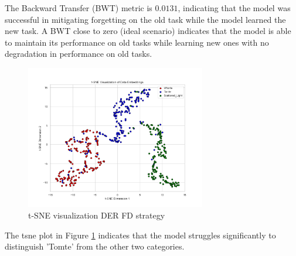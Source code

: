 The Backward Transfer (BWT) metric is $0.0131$, indicating that the model was successful in mitigating forgetting on the old task while the model learned the new task. A BWT close to zero (ideal scenario) indicates that the model is able to maintain its performance on old tasks while learning new ones with no degradation in performance on old tasks.

\begin{figure}[H]
    \centering
    \includegraphics[width=0.7\textwidth]{Grad Assignment/Images/tSNE_FractalDimension_DER_test.png}
    \caption{t-SNE visualization DER FD strategy}
    \label{fig:tsne_FD_DER}
\end{figure}

The \acrshort{tsne} plot in Figure \ref{fig:tsne_FD_DER} indicates that the model struggles significantly to distinguish 'Tomte' from the other two categories.

\newpage
